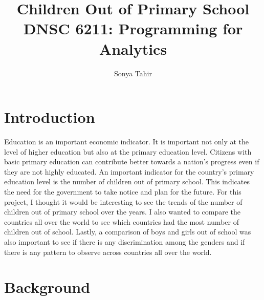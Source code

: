 \documentclass{article}
\title{Children Out of Primary School  \\ \small{DNSC 6211: Programming for Analytics}}
\author{Sonya Tahir}
\date{}
\begin{document}
\maketitle


\pagebreak
\tableofcontents


\pagebreak

%
%
\section{Introduction}
\label{introduction}

Education is an important economic indicator. It is important not only at the level of higher education but also at the primary education level. Citizens with basic primary education can contribute better towards a nation’s progress even if they are not highly educated. An important indicator for the country’s primary education level is the number of children out of primary school. This indicates the need for the government to take notice and plan for the future. For this project, I thought it would be interesting to see the trends of the number of children out of primary school over the years. I also wanted to compare the countries all over the world to see which countries had the most number of children out of school. Lastly, a comparison of boys and girls out of school was also important to see if there is any discrimination among the genders and if there is any pattern to observe across countries all over the world.

\section{Background}
\end{document}
